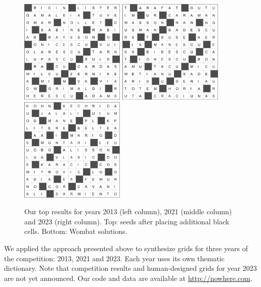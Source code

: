 \begin{figure}[th]
\vspace{0.25cm}

\includegraphics[height=5cm]{_empiricalSupport/_originalSubmission/y-2013/results/_runWombat/2013b.png}
%
\hspace{1cm}
%
\includegraphics[height=5cm]{_empiricalSupport/_originalSubmission/y-2021/results/_runWombat/2021b.png}
%
\hspace{1cm}
%
\includegraphics[height=5cm]{_empiricalSupport/_originalSubmission/y-2023/results/_runWombat/2023b.png}

\caption{Our top results for years 2013 (left column), 2021 (middle column) and 2023 (right column). Top: seeds after placing additional black cells. Bottom: {\sc Wombat} solutions.}
\label{fig:results}
\end{figure}

We applied the approach presented above to synthesize grids for three years of the competition: 2013, 2021 and 2023. Each year uses its own thematic dictionary. Note that competition results and human-designed grids for year 2023 are not yet announced. Our code and data are available at \url{http://nowhere.com}.



